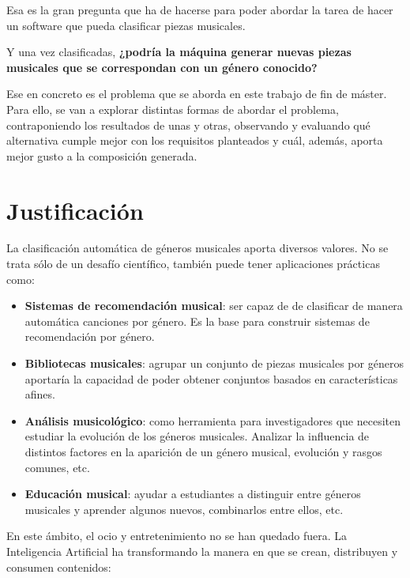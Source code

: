 Esa es la gran pregunta que ha de hacerse para poder abordar la tarea de hacer un software que pueda clasificar piezas musicales.

Y una vez clasificadas, \textbf{¿podría la máquina generar nuevas piezas musicales que se correspondan con un género conocido?}

Ese en concreto es el problema que se aborda en este trabajo de fin de máster. Para ello, se van a explorar distintas formas de abordar el problema, contraponiendo los resultados de unas y otras, observando y evaluando qué alternativa cumple mejor con los requisitos planteados y cuál, además, aporta mejor gusto a la composición generada.


\section{Justificación}
La clasificación automática de géneros musicales aporta diversos valores. No se trata sólo de un desafío científico, también puede tener aplicaciones prácticas como:

\begin{itemize}
    \item \textbf{Sistemas de recomendación musical}: ser capaz de de clasificar de manera automática canciones por género. Es la base para construir sistemas de recomendación por género.
    \item \textbf{Bibliotecas musicales}: agrupar un conjunto de piezas musicales por géneros aportaría la capacidad de poder obtener conjuntos basados en características afines.
    \item \textbf{Análisis musicológico}: como herramienta para investigadores que necesiten estudiar la evolución de los géneros musicales. Analizar la influencia de distintos factores en la aparición de un género musical, evolución y rasgos comunes, etc.
    \item \textbf{Educación musical}: ayudar a estudiantes a distinguir entre géneros musicales y aprender algunos nuevos, combinarlos entre ellos, etc.
\end{itemize}

En este ámbito, el ocio y entretenimiento no se han quedado fuera. La Inteligencia Artificial ha transformando la manera en que se crean, distribuyen y consumen contenidos:

